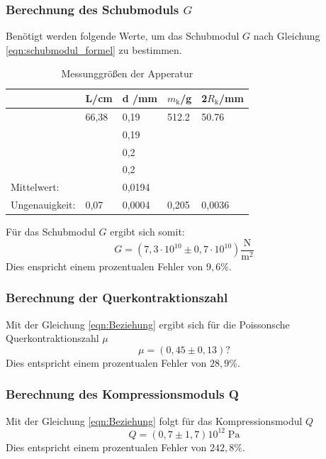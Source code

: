 \subsubsection{Berechnung des Schubmoduls $G$}
Benötigt werden folgende Werte, um das Schubmodul $G$ nach Gleichung \ref{eqn:schubmodul_formel}
zu bestimmen.
\begin{table}
    \centering
    \label{tab:tabelle_1}
    \begin{tabular}{p{3cm} | p{1.5cm} | p{1.5cm} | p{1.5cm} | p{1.5cm}}
    \toprule
    & L\;/\;cm & d \;/\;mm & $m_\text{k}$\;/\;g & 2$R_\text{k}$\;/\;mm\\
    \midrule
    & 66,38 & 0,19 & 512.2 &  50.76 \\
    &      & 0,19 &       &        \\    
    &      & 0,2  &       &        \\
    &      & 0,2  &       &        \\
    \midrule
    Mittelwert:    &      & 0,0194 &       &        \\
    Ungenauigkeit: & 0,07 & 0,0004 & 0,205 & 0,0036 \\
    \bottomrule
    \end{tabular}
    \caption{Messunggrößen der Apperatur}
    \label{tab:tabelle_2}
\end{table}

Für das Schubmodul $G$ ergibt sich somit:
\begin{equation*}
    G = (7,3 \cdot 10^{10} \pm 0,7 \cdot 10^{10} )\mathrm{\frac{N}{m^2}}
\end{equation*}
Dies enspricht einem prozentualen Fehler von $9,6\%$.

\subsubsection{Berechnung der Querkontraktionszahl}
Mit der Gleichung \ref{eqn:Beziehung} ergibt sich für die Poissonsche Querkontraktionszahl $\mu$
\begin{equation*}
    \mu = (0,45 \pm 0,13) \mathrm{?}
\end{equation*}
Dies entspricht einem prozentualen Fehler von $28,9\%$.

\subsubsection{Berechnung des Kompressionsmoduls Q}
Mit der Gleichung \ref{eqn:Beziehung} 
folgt für das Kompressionsmodul $Q$
\begin{equation*}
    Q = (0,7 \pm 1,7) 10^{12} \;\mathrm{Pa}
\end{equation*}
Dies entspricht einem prozentualen Fehler von $242,8\%$.
\newpage
